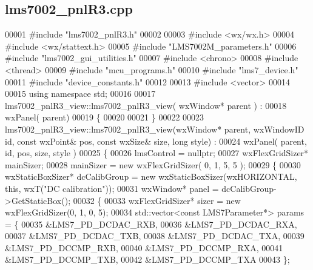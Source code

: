 \subsection{lms7002\+\_\+pnl\+R3.\+cpp}
\label{lms7002__pnlR3_8cpp_source}

\begin{DoxyCode}
00001 \textcolor{preprocessor}{#include "lms7002_pnlR3.h"}
00002 
00003 \textcolor{preprocessor}{#include <wx/wx.h>}
00004 \textcolor{preprocessor}{#include <wx/stattext.h>}
00005 \textcolor{preprocessor}{#include "LMS7002M_parameters.h"}
00006 \textcolor{preprocessor}{#include "lms7002_gui_utilities.h"}
00007 \textcolor{preprocessor}{#include <chrono>}
00008 \textcolor{preprocessor}{#include <thread>}
00009 \textcolor{preprocessor}{#include "mcu_programs.h"}
00010 \textcolor{preprocessor}{#include "lms7_device.h"}
00011 \textcolor{preprocessor}{#include "device_constants.h"}
00012 
00013 \textcolor{preprocessor}{#include <vector>}
00014 
00015 \textcolor{keyword}{using namespace }std;
00016 
00017 lms7002_pnlR3_view::lms7002_pnlR3_view( wxWindow* parent ) :
00018     wxPanel( parent)
00019 \{
00020 
00021 \}
00022 
00023 lms7002_pnlR3_view::lms7002_pnlR3_view(wxWindow* parent, wxWindowID \textcolor{keywordtype}{id}, \textcolor{keyword}{const} wxPoint& pos, \textcolor{keyword}{const} wxSize& 
      size, \textcolor{keywordtype}{long} style) :
00024     wxPanel( parent, id, pos, size, style )
00025 \{
00026     lmsControl = \textcolor{keyword}{nullptr};
00027     wxFlexGridSizer* mainSizer;
00028     mainSizer = \textcolor{keyword}{new} wxFlexGridSizer( 0, 1, 5, 5 );
00029     \{
00030         wxStaticBoxSizer* dcCalibGroup = \textcolor{keyword}{new} wxStaticBoxSizer(wxHORIZONTAL, \textcolor{keyword}{this}, wxT(\textcolor{stringliteral}{"DC calibration"}));
00031         wxWindow* panel = dcCalibGroup->GetStaticBox();
00032         \{
00033             wxFlexGridSizer* sizer = \textcolor{keyword}{new} wxFlexGridSizer(0, 1, 0, 5);
00034             std::vector<const LMS7Parameter*> params = \{
00035                 &LMS7_PD_DCDAC_RXB,
00036                 &LMS7_PD_DCDAC_RXA,
00037                 &LMS7_PD_DCDAC_TXB,
00038                 &LMS7_PD_DCDAC_TXA,
00039                 &LMS7_PD_DCCMP_RXB,
00040                 &LMS7_PD_DCCMP_RXA,
00041                 &LMS7_PD_DCCMP_TXB,
00042                 &LMS7_PD_DCCMP_TXA
00043             \};

\end{DoxyCode}
